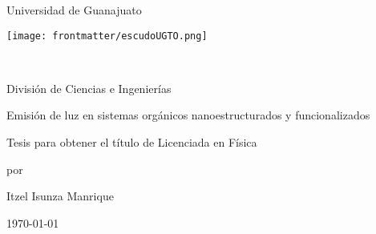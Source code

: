 \addtolength{\hoffset}{-0.7cm}
\begin{titlepage}
\begin{center}
{\LARGE{Universidad de Guanajuato\\
\vspace{.7cm}

   {{\texttt{[image: frontmatter/escudoUGTO.png]}}
   {\\
   \vspace{0.7cm}

{{{{{\LARGE Divisi\'on de Ciencias e Ingenier\'ias}}}}}\\   
    \vspace{.1cm}
   }}}}
\vspace{1.2cm}

{\ttfamily
{\Huge  Emisi\'on de luz en  \vspace{0.2cm}sistemas org\'anicos nanoestructurados  \vspace{0.2cm}y funcionalizados}
\vspace{0.7cm}

{\large Tesis para obtener el t\'itulo de Licenciada en F\'isica }
\vspace{0.4cm}


{\large{por}}
\vspace{0.5cm}

{\LARGE {Itzel Isunza Manrique}}
\vspace{0.6cm}
}



{\large{}}
\vspace{0.5cm}
{\large{}}
\vspace{0.7cm}

{\large{}}
\vspace{0.4cm}
{\large{}}

\vfill
\vspace{0.6cm}
\today
\end{center}
\end{titlepage}

